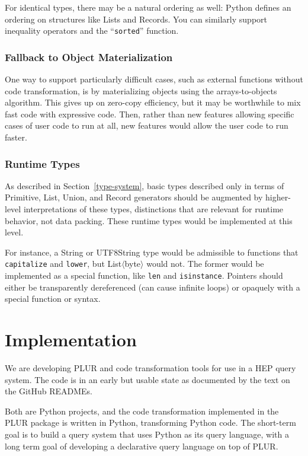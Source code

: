\documentclass[10pt, conference, compsocconf]{IEEEtran}
\begin{document}
For identical types, there may be a natural ordering as well: Python defines an ordering on structures like Lists and Records. You can similarly support inequality operators and the ``{\tt sorted}'' function.

\subsubsection{Fallback to Object Materialization}

One way to support particularly difficult cases, such as external functions without code transformation, is by materializing objects using the arrays-to-objects algorithm. This gives up on zero-copy efficiency, but it may be worthwhile to mix fast code with expressive code. Then, rather than new features allowing specific cases of user code to run at all, new features would allow the user code to run faster.

\subsubsection{Runtime Types}

As described in Section~\ref{type-system}, basic types described only in terms of Primitive, List, Union, and Record generators should be augmented by higher-level interpretations of these types, distinctions that are relevant for runtime behavior, not data packing. These runtime types would be implemented at this level.

For instance, a String or UTF8String type would be admissible to functions that {\tt capitalize} and {\tt lower}, but List$\langle$byte$\rangle$ would not. The former would be implemented as a special function, like {\tt len} and {\tt isinstance}. Pointers should either be transparently dereferenced (can cause infinite loops) or opaquely with a special function or syntax.

\section{Implementation}

We are developing PLUR and code transformation tools\cite{plur} for use in a HEP query system\cite{hepquery}. The code is in an early but usable state as documented by the text on the GitHub READMEs.

Both are Python projects, and the code transformation implemented in the PLUR package is written in Python, transforming Python code. The short-term goal is to build a query system that uses Python as its query language, with a long term goal of developing a declarative query language on top of PLUR.
\end{document}
